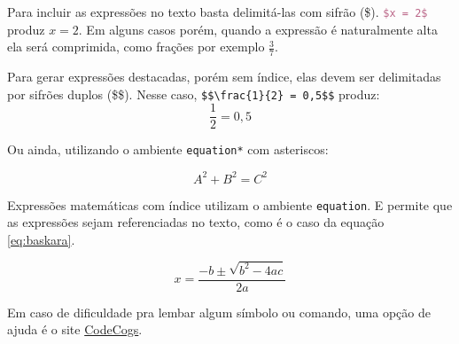
    Para incluir as expressões no texto basta delimitá-las com sifrão (\$).
    \lstinline[language=TeX,style=code]|$x = 2$| produz $x = 2$.
    Em alguns casos porém, quando a expressão é naturalmente alta ela será comprimida, como frações por exemplo $\frac{3}{7}$.


    Para gerar expressões destacadas, porém sem índice, elas devem ser delimitadas por sifrões duplos (\$\$).
    Nesse caso, \lstinline[language=teX,style=code]|$$\frac{1}{2} = 0,5$$| produz:
    $$\frac{1}{2} = 0,5$$
    
    Ou ainda, utilizando o ambiente \lstinline[language=TeX,style=code]|equation*| com asteriscos:
    
    \begin{equation*}
        A^{2} + B^{2} = C^{2}
    \end{equation*}


    Expressões matemáticas com índice utilizam o ambiente \lstinline[language=TeX,style=code]|equation|.
    E permite que as expressões sejam referenciadas no texto, como é o caso da equação \ref{eq:baskara}.

    \begin{equation}
        x = \frac{-b \pm \sqrt{b^2 - 4ac}}{2a}
        \label{eq:baskara}
    \end{equation}

    Em caso de dificuldade pra lembar algum símbolo ou comando, uma opção de ajuda é o site \href{https://www.codecogs.com/latex/eqneditor.php}{CodeCogs}.
